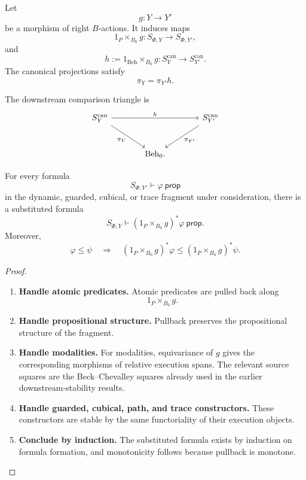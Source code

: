 Let
\[
  g:Y\to Y'
\]
be a morphism of right \(B\)-actions.  It induces maps
\[
  1_P\times_{B_0} g:
  S_{\Phi,Y}
  \longrightarrow
  S_{\Phi,Y'},
\]
and
\[
  h:=1_{\mathrm{Beh}}\times_{B_0} g:
  S^{\mathrm{can}}_Y
  \longrightarrow
  S^{\mathrm{can}}_{Y'}.
\]
The canonical projections satisfy
\[
  \pi_Y=\pi_{Y'}h.
\]

The downstream comparison triangle is
\[
\begin{tikzcd}[column sep=large,row sep=large]
S^{\mathrm{can}}_Y
  \arrow[rr, "h"]
  \arrow[dr, "\pi_Y"']
&&
S^{\mathrm{can}}_{Y'}
  \arrow[dl, "\pi_{Y'}"]
\\
&
\mathrm{Beh}_0 .
\end{tikzcd}
\]

\begin{proposition}
\label{prop:downstream-substitution}
For every formula
\[
  S_{\Phi,Y'}\vdash\varphi\ \mathsf{prop}
\]
in the dynamic, guarded, cubical, or trace fragment under consideration,
there is a substituted formula
\[
  S_{\Phi,Y}\vdash (1_P\times_{B_0} g)^*\varphi\ \mathsf{prop}.
\]
Moreover,
\[
  \varphi\leq\psi
  \quad\Longrightarrow\quad
  (1_P\times_{B_0} g)^*\varphi
  \leq
  (1_P\times_{B_0} g)^*\psi.
\]
\end{proposition}

\begin{proof}
\leavevmode
\begin{enumerate}
  \item \textbf{Handle atomic predicates.}
  Atomic predicates are pulled back along
  \[
    1_P\times_{B_0} g.
  \]

  \item \textbf{Handle propositional structure.}
  Pullback preserves the propositional structure of the fragment.

  \item \textbf{Handle modalities.}
  For modalities, equivariance of \(g\) gives the corresponding morphisms of
  relative execution spans.  The relevant source squares are the
  Beck--Chevalley squares already used in the earlier downstream-stability
  results.

  \item \textbf{Handle guarded, cubical, path, and trace constructors.}
  These constructors are stable by the same functoriality of their execution
  objects.

  \item \textbf{Conclude by induction.}
  The substituted formula exists by induction on formula formation, and
  monotonicity follows because pullback is monotone.
\end{enumerate}
\end{proof}

